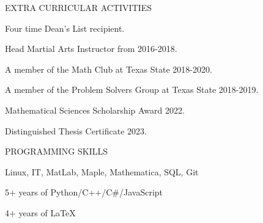 \documentclass{resume} %
\begin{document}
\begin{rSection}{EXTRA CURRICULAR ACTIVITIES}

\begin{rSubsection}{}{}{}{} 
\item Four time Dean's List recipient.
\item Head Martial Arts Instructor from 2016-2018.
\item A member of the Math Club at Texas State 2018-2020.
\item A member of the Problem Solvers Group at Texas State 2018-2019.
\item Mathematical Sciences Scholarship Award 2022.
\item Distinguished Thesis Certificate 2023.
\end{rSubsection}

\end{rSection}



\begin{rSection}{PROGRAMMING SKILLS} \itemsep -3pt  

\begin{rSubsection}{}{}{}{} 
\item Linux, IT, MatLab, Maple, Mathematica, SQL, Git
\item 5+ years of Python/C++/C\#/JavaScript
\item 4+ years of \LaTeX
\end{rSubsection}

\end{rSection} 
\end{document}
